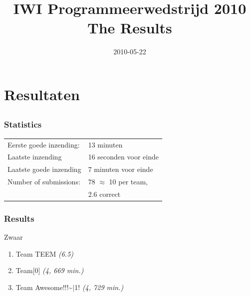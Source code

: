 \documentclass[14pt]{beamer}
\title{IWI Programmeerwedstrijd 2010\\\vspace{4mm}\normalsize{}The Results}
\author{}
\date{2010-05-22}
\begin{document}

\frame{\titlepage}

\section{Resultaten}
\subsection{}

\begin{frame}
  \frametitle{Statistics}
  \begin{tabular}{ll}
    Eerste goede inzending: & 13 minuten\\
    Laatste inzending       & 16 seconden voor einde \\
    Laatste goede inzending & 7 minuten voor einde \\
    Number of submissions:  & 78 $\approx$ 10 per team,\\& 2.6 correct\\
  \end{tabular}
\end{frame}

\begin{frame}
  \frametitle{Results}
  \begin{block}{Zwaar}
    \begin{enumerate}
     \vspace*{7mm}
     \item<4->          \Large      Team TEEM \textit{(6.5)}
     \vspace*{5mm}
     \item<3->          \large      Team[0] \textit{(4, 669 min.)}
     \vspace*{5mm}
     \item<2->          \normalsize Team Awesome!!!\~{}$|$1! \textit{(4, 729 min.)}
     \vspace*{7mm}
    \end{enumerate}
  \end{block}
\end{frame}
\end{document}
